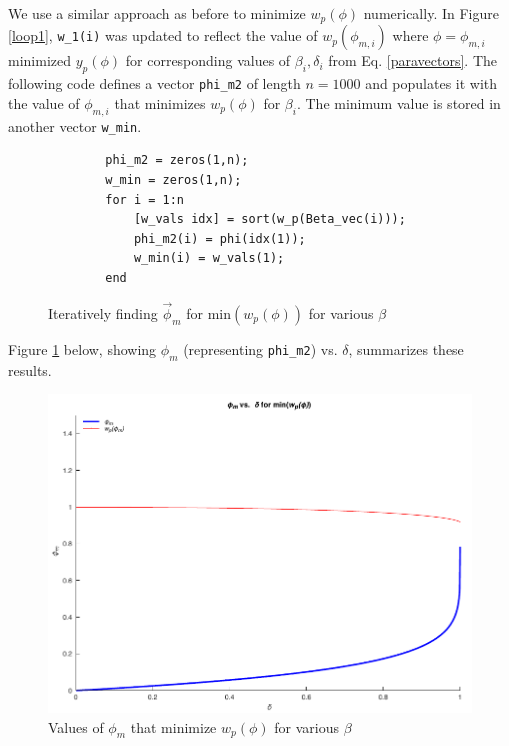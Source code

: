 \documentclass[11pt]{article}
\begin{document}
We use a similar approach as before to minimize $w_p(\phi)$ numerically. 
In Figure \ref{loop1}, \verb|w_1(i)| was updated
to reflect the value of $w_p(\phi_{m,i})$ where $\phi=\phi_{m,i}$ minimized $y_p(\phi)$ for corresponding values of $\beta_i,\delta_i$
from Eq. \ref{paravectors}. The following code defines a vector \verb|phi_m2| of length $n=1000$ and populates it with the value of $\phi_{m,i}$ that minimizes $w_p(\phi)$ for $\beta_i$.
The minimum value is stored in another vector \verb|w_min|.

\begin{figure}[H]
    \begin{verbatim}
        phi_m2 = zeros(1,n);
        w_min = zeros(1,n);
        for i = 1:n
            [w_vals idx] = sort(w_p(Beta_vec(i)));
            phi_m2(i) = phi(idx(1));
            w_min(i) = w_vals(1);
        end
    \end{verbatim}
    \caption{Iteratively finding $\vec\phi_m$ for $\mathrm{min}(w_p(\phi))$ for various $\beta$}
\end{figure}

Figure \ref{wminplot} below, showing $\phi_m$ (representing \verb|phi_m2|) vs. $\delta$, summarizes these results.

\begin{figure}[H]
    \includegraphics{plots/phi_delta_min.pdf}
    \caption{Values of $\phi_m$ that minimize $w_p(\phi)$ for various $\beta$}\label{wminplot}
\end{figure}

\end{document}
